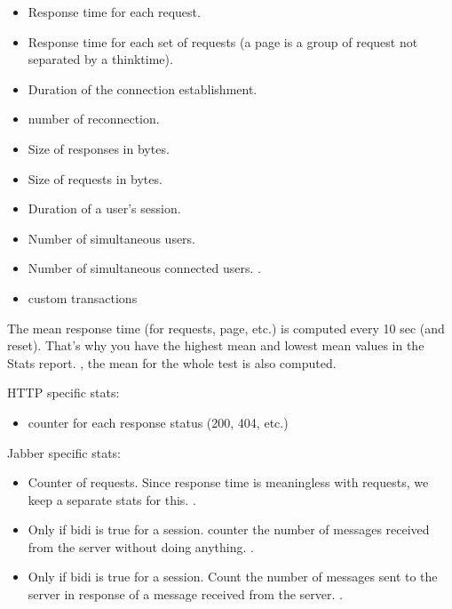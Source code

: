 \documentclass{TSUNG-en}
\begin{document}
\begin{itemize}
\item  {} Response time for each request.
\item  {} Response time for each set of requests (a page is a group
  of request not separated by a thinktime).
\item  {} Duration of the connection establishment.
\item  {} number of reconnection.
\item  {} Size of responses in bytes.
\item  {} Size of requests in bytes.
\item  {} Duration of a user's session.
\item  {} Number of simultaneous users.
\item  {} Number of simultaneous connected users. .
\item  custom transactions
\end{itemize}

The mean response time (for requests, page, etc.) is computed every 10
sec (and reset). That's why you have the highest mean and lowest mean
values in the Stats report. , the mean for
the whole test is also computed.

HTTP specific stats:
\begin{itemize}
\item counter for each response status (200, 404, etc.)
\end{itemize}

Jabber specific stats:
\begin{itemize}
\item {} Counter of  requests. Since
  response time is meaningless with 
  requests, we keep a separate stats for this. .
\item {} Only if bidi is true for a
  session. counter the number of messages received from the server
  without doing anything.  .
\item {} Only if bidi is true for a
  session. Count the number of messages sent to the server in response
  of a message received from the server. .
\end{itemize}
\end{document}
